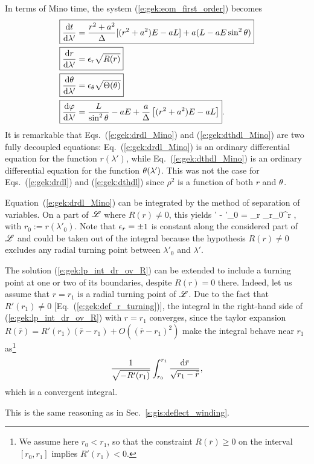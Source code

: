 In terms of Mino time, the system (\ref{e:gek:eom_first_order}) becomes
\begin{subequations}
\label{e:gek:eom_Mino}
\begin{align}
& \fbox{$\displaystyle  \frac{\mathrm{d} t}{\mathrm{d} \lambda'} = \frac{r^2 + a^2}{\Delta} [(r^2 + a^2) E - a L] + a ( L - a E \sin^2\theta ) $} \label{e:gek:dtdl_Mino} \\
& \fbox{$\displaystyle  \frac{\mathrm{d} r}{\mathrm{d} \lambda'} = \epsilon_r \sqrt{ R(r) } $} \label{e:gek:drdl_Mino}\\
& \fbox{$\displaystyle  \frac{\mathrm{d} \theta}{\mathrm{d} \lambda'} = \epsilon_\theta \sqrt{\Theta(\theta)} $} \label{e:gek:dthdl_Mino}\\
& \fbox{$\displaystyle  \frac{\mathrm{d} \varphi}{\mathrm{d} \lambda'}  = \frac{L}{\sin^2\theta} - a E
    + \frac{a}{\Delta}\left[(r^2 + a^2) E - a L\right] $} . \label{e:gek:dphdl_Mino}
\end{align}
\end{subequations}
It is remarkable that Eqs.~(\ref{e:gek:drdl_Mino}) and (\ref{e:gek:dthdl_Mino})
are two fully decoupled equations: Eq.~(\ref{e:gek:drdl_Mino}) is an ordinary
differential equation for the function $r(\lambda')$, while Eq.~(\ref{e:gek:dthdl_Mino})
is an ordinary differential equation for the function $\theta(\lambda')$. This was
not the case for Eqs.~(\ref{e:gek:drdl}) and (\ref{e:gek:dthdl}) since $\rho^2$ is
a function of both $r$ and $\theta$.

Equation~(\ref{e:gek:drdl_Mino}) can be integrated by the method of separation
of variables. On a part of $\mathscr{L}$ where $R(r)\neq 0$, this yields
\be \label{e:gek:lp_int_dr_ov_R}
    \lambda' - \lambda'_0 = \eps_r \int_{r_0}^r  ,
\ee
with $r_0 := r(\lambda'_0)$. Note that $\epsilon_r=\pm 1$ is constant along
the considered part of $\mathscr{L}$
and could be taken out of the integral because the hypothesis $R(r)\neq 0$
excludes any radial turning point between $\lambda'_0$ and $\lambda'$.

The solution (\ref{e:gek:lp_int_dr_ov_R})
can be extended to include a turning point at one or two of its boundaries,
despite $R(r)=0$ there.
Indeed, let us assume that $r=r_1$ is a radial turning point of $\mathscr{L}$.
Due to the fact that $R'(r_1)\neq 0$ [Eq.~(\ref{e:gek:def_r_turning})], the
integral in the right-hand side of (\ref{e:gek:lp_int_dr_ov_R}) with $r=r_1$
converges, since
the taylor expansion $R(\bar{r}) = R'(r_1) (\bar{r} - r_1) + O((\bar{r} - r_1)^2)$
make the integral behave near $r_1$
as\footnote{We assume here $r_0<r_1$, so that the constraint
$R(\bar{r})\geq 0$ on the interval $[r_0,r_1]$ implies $R'(r_1)<0$.}
\[
    \frac{1}{\sqrt{-R'(r_1)}} \int_{r_0}^{r_1} \frac{\mathrm{d} \bar{r}}{\sqrt{r_1 - \bar{r}}} ,
\]
which is a convergent integral.
\begin{remark}
This is the same reasoning as in Sec.~\ref{s:gis:deflect_winding}.
\end{remark}


